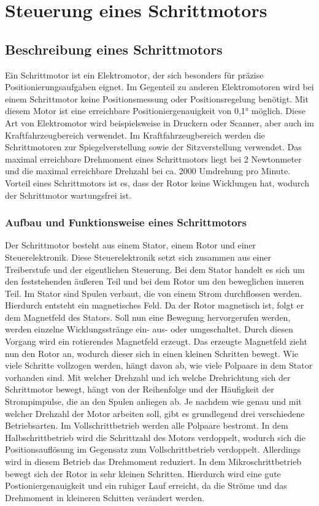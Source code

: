 

\chapter{Steuerung eines Schrittmotors}
\section{Beschreibung eines Schrittmotors}
Ein Schrittmotor ist ein Elektromotor, der sich besonders für präzise Positionierungsaufgaben eignet. Im Gegenteil zu anderen Elektromotoren wird bei einem Schrittmotor keine Positionsmessung oder Positionsregelung benötigt. Mit diesem Motor ist eine erreichbare Positioniergenauigkeit von 0,1° möglich. Diese Art von Elektromotor wird beispielsweise in Druckern oder Scanner, aber auch im Kraftfahrzeugbereich verwendet. Im Kraftfahrzeugbereich werden die Schrittmotoren zur Spiegelverstellung sowie der Sitzverstellung verwendet. Das maximal erreichbare Drehmoment eines Schrittmotors liegt bei 2 Newtonmeter und die maximal erreichbare Drehzahl bei ca. 2000 Umdrehung pro Minute. Vorteil eines Schrittmotors ist es, dass der Rotor keine Wicklungen hat, wodurch der Schrittmotor wartungsfrei ist. \cite{Babiel.2023}\cite{Hagl.2021}
\subsection{Aufbau und Funktionsweise eines Schrittmotors}
Der Schrittmotor besteht aus einem Stator, einem Rotor und einer Steuerelektronik. Diese Steuerelektronik setzt sich zusammen aus einer Treiberstufe und der eigentlichen Steuerung. Bei dem Stator handelt es sich um den feststehenden äußeren Teil und bei dem Rotor um den beweglichen inneren Teil. Im Stator sind Spulen verbaut, die von einem Strom durchflossen werden. Hierdurch entsteht ein magnetisches Feld. Da der Rotor magnetisch ist, folgt er dem Magnetfeld des Stators. Soll nun eine Bewegung hervorgerufen werden, werden einzelne Wicklungsstränge ein- aus- oder umgeschaltet. Durch diesen Vorgang wird ein rotierendes Magnetfeld erzeugt. Das erzeugte Magnetfeld zieht nun den Rotor an, wodurch dieser sich in einen kleinen Schritten bewegt. Wie viele Schritte vollzogen werden, hängt davon ab, wie viele Polpaare in dem Stator vorhanden sind. Mit welcher Drehzahl und ich welche Drehrichtung sich der Schrittmotor bewegt, hängt von der Reihenfolge und der Häufigkeit der Strompimpulse, die an den Spulen anliegen ab. Je nachdem wie genau und mit welcher Drehzahl der Motor arbeiten soll, gibt es grundlegend drei verschiedene Betriebsarten. Im Vollschrittbetrieb werden alle Polpaare bestromt. In dem Halbschrittbetrieb wird die Schrittzahl des Motors verdoppelt, wodurch sich die Positionsauflösung im Gegensatz zum Vollschrittbetrieb verdoppelt. Allerdings wird in diesem Betrieb das Drehmoment reduziert. In dem Mikroschrittbetrieb bewegt sich der Rotor in sehr kleinen Schritten. Hierdurch wird eine gute Postioniergenauigkeit und ein ruhiger Lauf erreicht, da die Ströme und das Drehmoment in kleineren Schitten verändert werden. \cite{Hagl.2021}\cite{Bernstein.2018} 
